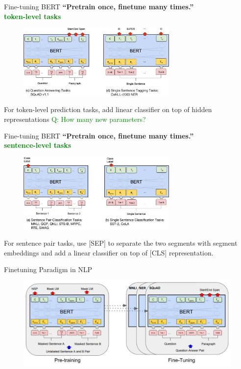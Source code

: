 \documentclass[serif, aspectratio=169]{beamer}
\begin{document}
\begin{frame}{Fine-tuning BERT}
    \centering
    \textbf{``Pretrain once, finetune many times.''} \\
    \textcolor{green}{\textbf{token-level tasks}}
    \begin{figure}
        \centering
        \includegraphics[width=0.7\textwidth]{Figures/Fintuning.png}
    \end{figure}
    For token-level prediction tasks, add linear classifier on top of hidden representations
    \textcolor{green}{Q: How many new parameters?}
\end{frame}

\begin{frame}{Fine-tuning BERT}
    \centering
    \textbf{``Pretrain once, finetune many times.''} \\
    \textcolor{green}{\textbf{sentence-level tasks}}
    \begin{figure}
        \centering
        \includegraphics[width=0.7\textwidth]{Figures/finetuning1.png}
    \end{figure}
    For sentence pair tasks, use [SEP] to separate the two segments with segment embeddings and add a linear classifier on top of [CLS] representation.
\end{frame}

\begin{frame}{Finetuning Paradigm in NLP}
    \begin{figure}
        \centering
        \includegraphics[width=1\textwidth]{Figures/paradaigm.png}
    \end{figure}
\end{frame}
\end{document}
